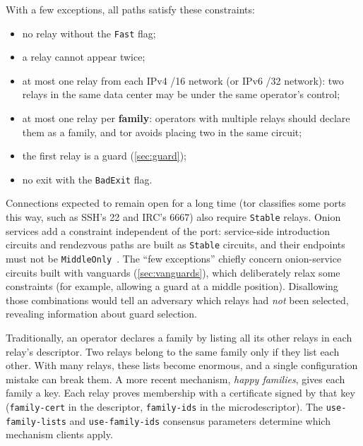 With a few exceptions, all paths satisfy these constraints:
\begin{itemize}
  \item no relay without the \texttt{Fast} flag;
  \item a relay cannot appear twice;
  \item at most one relay from each IPv4 /16 network (or IPv6 /32 network): two relays in the same data center may be under the same operator's control;
  \item at most one relay per \textbf{family}: operators with multiple relays should declare them as a family, and tor avoids placing two in the same circuit;
  \item the first relay is a guard (\cref{sec:guard});
  \item no exit with the \texttt{BadExit} flag.
\end{itemize}
Connections expected to remain open for a long time (tor classifies some ports this way, such as SSH's 22 and IRC's 6667) also require \texttt{Stable} relays. Onion services add a constraint independent of the port: service-side introduction circuits and rendezvous paths are built as \texttt{Stable} circuits, and their endpoints must not be \texttt{MiddleOnly}~. The \enquote{few exceptions} chiefly concern onion-service circuits built with vanguards (\cref{sec:vanguards}), which deliberately relax some constraints (for example, allowing a guard at a middle position). Disallowing those combinations would tell an adversary which relays had \emph{not} been selected, revealing information about guard selection.

\begin{approfondimento}
Traditionally, an operator declares a family by listing all its other relays in each relay's descriptor. Two relays belong to the same family only if they list each other. With many relays, these lists become enormous, and a single configuration mistake can break them. A more recent mechanism, \emph{happy families}, gives each family a key. Each relay proves membership with a certificate signed by that key (\texttt{family-cert} in the descriptor, \texttt{family-ids} in the microdescriptor). The \texttt{use-family-lists} and \texttt{use-family-ids} consensus parameters determine which mechanism clients apply.
\end{approfondimento}

